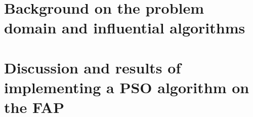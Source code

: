 \documentclass[11pt,a4paper]{book}
\begin{document}
\frontmatter
\makecover
\tableofcontents
\listoffigures
\listofalgorithms
\listoftables
\mainmatter
\part{Background on the problem domain and influential algorithms}
\part{Discussion and results of implementing a PSO algorithm on the FAP}
%
\backmatter


\end{document}
